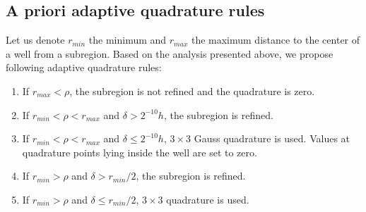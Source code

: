\documentclass{elsarticle}
\newcommand{\noteJB}[1]{{\color{Blue} \textbf{JB: } \textit{#1}}}
\newcommand{\notePE}[1]{{\color{Orange} \textbf{PE: } \textit{#1}}}
\begin{document}
\subsection{A priori adaptive quadrature rules}
Let us denote $r_{min}$ the minimum and $r_{max}$ the maximum distance to the center of a well from a subregion. 
Based on the analysis presented above, we propose following adaptive quadrature rules:




\begin{enumerate}
 \item If $r_{max} < \rho$, the subregion is not refined and the quadrature is zero.
 \item If $r_{min} < \rho < r_{max}$ and $\delta > 2^{-10}h$, the subregion is refined.
 \item If $r_{min} < \rho < r_{max}$ and $\delta \le 2^{-10}h$, $3\times3$ Gauss quadrature is used.
 Values at quadrature points lying inside the well are set to zero.
 \item If $r_{min} > \rho$ and $\delta > r_{min} / 2$, the subregion is refined.
 \item If $r_{min} > \rho$ and $\delta \le r_{min} / 2$, $3\times3$ quadrature is used.
\end{enumerate}
\end{document}
